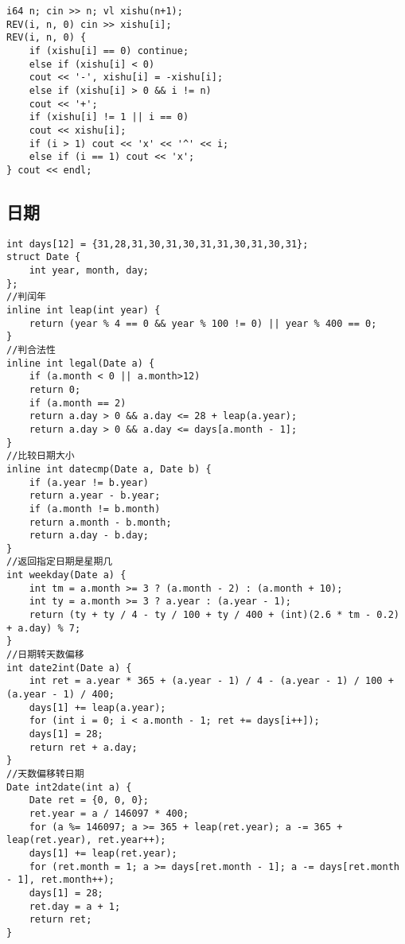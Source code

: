 \documentclass[a4paper,landscape,twocolumn]{ctexart}
\begin{document}
\begin{lstlisting}
i64 n; cin >> n; vl xishu(n+1);
REV(i, n, 0) cin >> xishu[i];
REV(i, n, 0) {
	if (xishu[i] == 0) continue;
	else if (xishu[i] < 0)
	cout << '-', xishu[i] = -xishu[i];
	else if (xishu[i] > 0 && i != n)
	cout << '+';
	if (xishu[i] != 1 || i == 0)
	cout << xishu[i];
	if (i > 1) cout << 'x' << '^' << i;
	else if (i == 1) cout << 'x';
} cout << endl;
\end{lstlisting}

\subsection{日期}

\begin{lstlisting}
int days[12] = {31,28,31,30,31,30,31,31,30,31,30,31};
struct Date {
	int year, month, day;
};
//判闰年	
inline int leap(int year) {
	return (year % 4 == 0 && year % 100 != 0) || year % 400 == 0;
}
//判合法性
inline int legal(Date a) {
	if (a.month < 0 || a.month>12)
	return 0;
	if (a.month == 2)
	return a.day > 0 && a.day <= 28 + leap(a.year);
	return a.day > 0 && a.day <= days[a.month - 1];
}
//比较日期大小
inline int datecmp(Date a, Date b) {
	if (a.year != b.year)
	return a.year - b.year;
	if (a.month != b.month)
	return a.month - b.month;
	return a.day - b.day;
}
//返回指定日期是星期几
int weekday(Date a) {
	int tm = a.month >= 3 ? (a.month - 2) : (a.month + 10);
	int ty = a.month >= 3 ? a.year : (a.year - 1);
	return (ty + ty / 4 - ty / 100 + ty / 400 + (int)(2.6 * tm - 0.2) + a.day) % 7;
}
//日期转天数偏移
int date2int(Date a) {
	int ret = a.year * 365 + (a.year - 1) / 4 - (a.year - 1) / 100 + (a.year - 1) / 400;
	days[1] += leap(a.year);
	for (int i = 0; i < a.month - 1; ret += days[i++]);
	days[1] = 28;
	return ret + a.day;
}
//天数偏移转日期
Date int2date(int a) {
	Date ret = {0, 0, 0};
	ret.year = a / 146097 * 400;
	for (a %= 146097; a >= 365 + leap(ret.year); a -= 365 + leap(ret.year), ret.year++);
	days[1] += leap(ret.year);
	for (ret.month = 1; a >= days[ret.month - 1]; a -= days[ret.month - 1], ret.month++);
	days[1] = 28;
	ret.day = a + 1;
	return ret;
}
\end{lstlisting}
\end{document}
